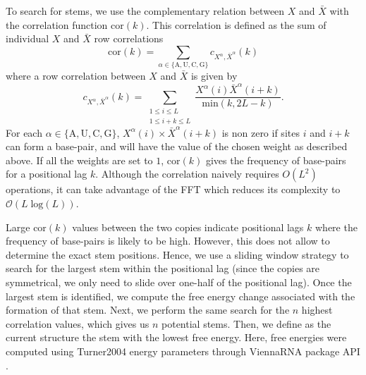 To search for stems, we use the complementary relation between \(X\) and \(\bar{X}\) with the correlation function \(\text{cor}(k)\). This correlation is defined as the sum of individual \(X\) and \(\bar{X}\) row correlations
\begin{equation}
\text{cor}(k)=\sum_{\alpha \in \{\text{A},\text{U},\text{C},\text{G}\}}c_{X^{\alpha},\bar{X}^{\alpha}}(k)
\end{equation}
where a row correlation between \(X\) and \(\bar{X}\) is given by
\begin{equation}
c_{X^\alpha,\bar{X}^\alpha}(k) = \sum\limits_{\substack{1\leq i \leq L\\1 \leq i + k \leq L}} \frac{X^\alpha(i) \bar{X}^\alpha(i+k)}{\text{min}(k, 2 L-k)}.
\end{equation}
For each \(\alpha \in \{\text{A},\text{U},\text{C},\text{G}\}\), \(X^\alpha(i) \times \bar{X}^\alpha(i+k)\) is non zero if sites \(i\) and \(i+k\) can form a base-pair, and will have the value of the chosen weight as described above. If all the weights are set to $1$, \(\text{cor}(k)\) gives the frequency of base-pairs for a positional lag \(k\). Although the correlation naively requires \(O(L^2)\) operations, it can take advantage of the \ac{FFT} which reduces its complexity to \(\mathcal{O}(L\;\text{log}(L))\).

Large \(\text{cor}(k)\) values between the two copies indicate positional lags \(k\) where the frequency of base-pairs is likely to be high. However, this does not allow to determine the exact stem positions. Hence, we use a sliding window strategy to search for the largest stem within the positional lag (since the copies are symmetrical, we only need to slide over one-half of the positional lag). Once the largest stem is identified, we compute the free energy change associated with the formation of that stem. Next, we perform the same search for the \(n\) highest correlation values, which gives us \(n\) potential stems. Then, we define as the current structure the stem with the lowest free energy. Here, free energies were computed using Turner2004 energy parameters through ViennaRNA package \ac{API} \cite{lorenz11_vienn_packag}.


